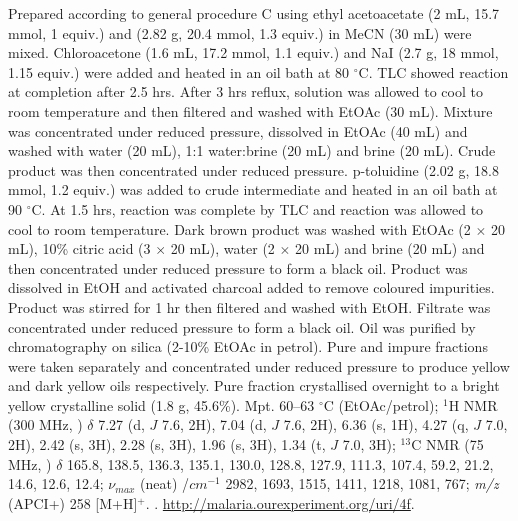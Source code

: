 \documentclass[12pt, a4paper,titlepage]{article}
\begin{document}
{Prepared according to general procedure C using ethyl acetoacetate (2 mL, 15.7 mmol, 1 equiv.) and  (2.82 g, 20.4 mmol, 1.3 equiv.) in MeCN (30 mL) were mixed. Chloroacetone (1.6 mL, 17.2 mmol, 1.1 equiv.) and NaI (2.7 g, 18 mmol, 1.15 equiv.) were added and heated in an oil bath at 80 $^\circ$C. TLC showed reaction at completion after 2.5 hrs. After 3 hrs reflux, solution was allowed to cool to room temperature and then filtered and washed with EtOAc (30 mL). Mixture was concentrated under reduced pressure, dissolved in EtOAc (40 mL) and washed with water (20 mL), 1:1 water:brine (20 mL) and brine (20 mL). Crude product was then concentrated under reduced pressure. p-toluidine (2.02 g, 18.8 mmol, 1.2 equiv.) was added to crude intermediate and heated in an oil bath at 90 $^\circ$C. At 1.5 hrs, reaction was complete by TLC and reaction was allowed to cool to room temperature. Dark brown product was washed with EtOAc (2 $\times$ 20 mL), 10\% citric acid (3 $\times$ 20 mL), water (2 $\times$ 20 mL) and brine (20 mL) and then concentrated under reduced pressure to form a black oil. Product was dissolved in EtOH and activated charcoal added to remove coloured impurities. Product was stirred for 1 hr then filtered and washed with EtOH. Filtrate was concentrated under reduced pressure to form a black oil. Oil was purified by chromatography on silica (2-10\% EtOAc in petrol). Pure and impure fractions were taken separately and concentrated under reduced pressure to produce yellow and dark yellow oils respectively. Pure fraction crystallised overnight to a bright yellow crystalline solid (1.8 g, 45.6\%).
Mpt. 60--63 $^\circ$C (EtOAc/petrol); 
$^1$H NMR (300 MHz, ) $\delta$  7.27 (d, $J$ 7.6, 2H), 7.04 (d, $J$ 7.6, 2H), 6.36 (s, 1H), 4.27 (q, $J$ 7.0, 2H), 2.42 (s, 3H), 2.28 (s, 3H), 1.96 (s, 3H), 1.34 (t, $J$ 7.0, 3H); 
  $^{13}$C NMR (75 MHz, ) $\delta$ 165.8, 138.5, 136.3, 135.1, 130.0, 128.8, 127.9, 111.3, 107.4, 59.2, 21.2, 14.6, 12.6, 12.4; 
 $\nu_{max}$ (neat) /$cm^{-1}$ 2982, 1693, 1515, 1411, 1218, 1081, 767; 
\emph{m/z} (APCI+) 258 [M+H]$^+$.
. 
\url{http://malaria.ourexperiment.org/uri/4f}. 

}
\end{document}
